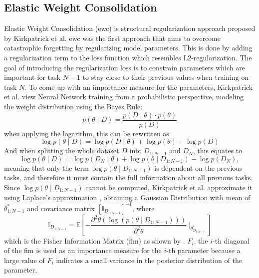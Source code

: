 \subsection{Elastic Weight Consolidation}
\label{sec:Related_work:Continual_Learning:EWC}
Elastic Weight Consolidation (\gls{ewc}) \cite{kirkpatrick2017overcoming} is structural regularization approach proposed by Kirkpatrick et al.
\gls{ewc} was the first approach that aims to overcome catastrophic forgetting by regularizing model parameters. This is done by adding a regularization
term to the loss function which resembles L2-regularization. The goal of introducing the regularization loss is to constrain parameters which
are important for task $N-1$ to stay close to their previous values when training on task $N$. To come up with an importance measure for the parameters,
Kirkpatrick et al. view  Neural Network training from a probabilistic perspective, modeling the weight distribution using the Bayes Rule:
\begin{equation}
    p(\theta \mid D) = \frac{p(D \mid \theta) \cdot p(\theta)}{p(D)}
\end{equation}
when applying the logarithm, this can be rewritten as
\begin{equation}
    \log p(\theta \mid D) = \log p(D \mid \theta) + \log p(\theta) - \log p(D)
\end{equation}
And when splitting the whole dataset $D$ into $D_{1:N-1}$ and $D_N$, this equates to
\begin{equation}
    \log p(\theta \mid D) = \log p(D_N \mid \theta) + \log p(\theta \mid D_{1:N-1}) - \log p(D_N),
\end{equation}
meaning that only the term $\log p(\theta \mid D_{1:N-1})$ is dependent on the previous tasks, and therefore it must contain the full information 
about all previous tasks. Since $\log p(\theta \mid D_{1:N-1})$ cannot be computed, Kirkpatrick et al. approximate it using Laplace's approximation
\cite{mackay2003information}, obtaining a Gaussian Distribution with mean of $\theta^*_{1:N-1}$ and covariance matrix $[\mathbb{I}_{D_{1:N-1}}]^{-1}$,
where
\begin{equation}
    \mathbb{I}_{D_{1:N-1}} = \mathbb{E} [- \frac{\partial^2 \theta (\log (p(\theta \mid D_{1:N-1})))}{\partial^2 \theta} \mid_{\theta^*_{D_{1:N-1}}}]
\end{equation} 
which is the Fisher Information Matrix (\gls{fim}) as shown by \cite{aich2021elastic}. $F_i$, the $i$-th diagonal of the \gls{fim} is used as an
importance measure for the $i$-th parameter because a large value of $F_i$ indicates a small variance in the posterior distribution of the parameter,
